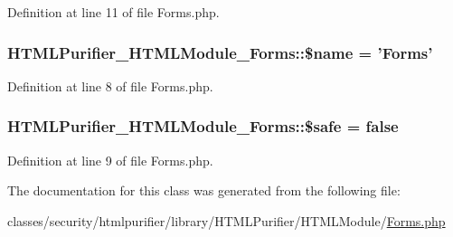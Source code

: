 Definition at line 11 of file Forms.\+php.

\hypertarget{classHTMLPurifier__HTMLModule__Forms_a8e88ddf919ddbe2def4b30ab19e055fb}{
\subsubsection[{\$name}]{\setlength{\rightskip}{0pt plus 5cm}H\+T\+M\+L\+Purifier\+\_\+\+H\+T\+M\+L\+Module\+\_\+\+Forms\+::\$name = 'Forms'}}\label{classHTMLPurifier__HTMLModule__Forms_a8e88ddf919ddbe2def4b30ab19e055fb}


Definition at line 8 of file Forms.\+php.

\hypertarget{classHTMLPurifier__HTMLModule__Forms_a242c1674d909d22435954c43df3fc9c3}{
\subsubsection[{\$safe}]{\setlength{\rightskip}{0pt plus 5cm}H\+T\+M\+L\+Purifier\+\_\+\+H\+T\+M\+L\+Module\+\_\+\+Forms\+::\$safe = false}}\label{classHTMLPurifier__HTMLModule__Forms_a242c1674d909d22435954c43df3fc9c3}


Definition at line 9 of file Forms.\+php.



The documentation for this class was generated from the following file\+:\begin{DoxyCompactItemize}
\item 
classes/security/htmlpurifier/library/\+H\+T\+M\+L\+Purifier/\+H\+T\+M\+L\+Module/\hyperlink{Forms_8php}{Forms.\+php}\end{DoxyCompactItemize}

